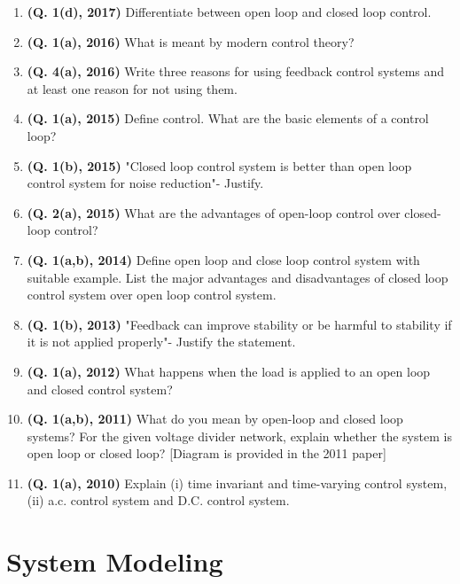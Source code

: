 \documentclass[12pt, a4paper]{article}
\begin{document}
\begin{enumerate}
		\item \textbf{(Q. 1(d), 2017)} Differentiate between open loop and closed loop control.
		\item \textbf{(Q. 1(a), 2016)} What is meant by modern control theory?
		\item \textbf{(Q. 4(a), 2016)} Write three reasons for using feedback control systems and at least one reason for not using them.
		\item \textbf{(Q. 1(a), 2015)} Define control. What are the basic elements of a control loop?
		\item \textbf{(Q. 1(b), 2015)} "Closed loop control system is better than open loop control system for noise reduction"- Justify.
		\item \textbf{(Q. 2(a), 2015)} What are the advantages of open-loop control over closed-loop control?
		\item \textbf{(Q. 1(a,b), 2014)} Define open loop and close loop control system with suitable example. List the major advantages and disadvantages of closed loop control system over open loop control system.
		\item \textbf{(Q. 1(b), 2013)} "Feedback can improve stability or be harmful to stability if it is not applied properly"- Justify the statement.
		\item \textbf{(Q. 1(a), 2012)} What happens when the load is applied to an open loop and closed control system?
		\item \textbf{(Q. 1(a,b), 2011)} What do you mean by open-loop and closed loop systems? For the given voltage divider network, explain whether the system is open loop or closed loop? [Diagram is provided in the 2011 paper]
		\item \textbf{(Q. 1(a), 2010)} Explain (i) time invariant and time-varying control system, (ii) a.c. control system and D.C. control system.
	\end{enumerate}
	
	\section{System Modeling}
\end{document}
